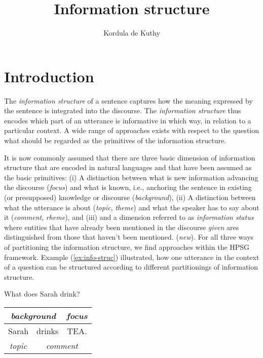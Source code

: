 \documentclass[output=paper]{langsci/langscibook}
\author{Kordula de Kuthy\affiliation{Universität Tübingen}}
\title{Information structure}
\begin{document}
\label{chap-information-structure}



\section{Introduction} 


The \textit{information structure} of a sentence captures how the meaning
expressed by the sentence is integrated into the discourse.
The \textit{information structure} thus encodes which part of an
  utterance is informative in which way, in relation to a particular context.
A wide range of approaches exists with respect to the question what
should be regarded as the primitives of the information structure.

It is now commonly assumed that there are three basic dimension of
information structure that are encoded in natural languages and that
have been assumed as the basic primitives: (i) A distinction between
what is new information advancing the discourse (\emph{focus}) and
what is known, i.e., anchoring the sentence in existing (or
presupposed) knowledge or discourse (\emph{background}), (ii) A
distinction between what the utterance is about (\emph{topic},
\emph{theme}) and what the speaker has to say about it
(\emph{comment}, \emph{rheme}), and (iii) and a dimension referred to
as \textit{information status} where entities that have already been
mentioned in the discourse \textit{given} ares distinguished from those
that haven't been mentioned. (\emph{new}). For all three ways of
partitioning the information structure, we find approaches within the
HPSG framework.
Example (\ref{ex:info-struc}) illustrated, how one utterance in the context of a question can be
structured according to different partitionings of information
structure.
\begin{exe}
\ex\label{ex:info-struc}
\begin{xlist}
  What does Sarah drink?
  \begin{tabular}[c]{|c|c|c|}
    \multicolumn{2}{c|}{\small\textsl{background}} &
                                                     \multicolumn{1}{c}{\small\textsl{focus}}\\\hline Sarah & drinks &
                                                                                                                      TEA.\\\hline
    \multicolumn{1}{c}{\small\textsl{topic}} & \multicolumn{2}{|c}{\small\textsl{comment}}\\
  \end{tabular}
\end{xlist}

\end{exe}
\end{document}
